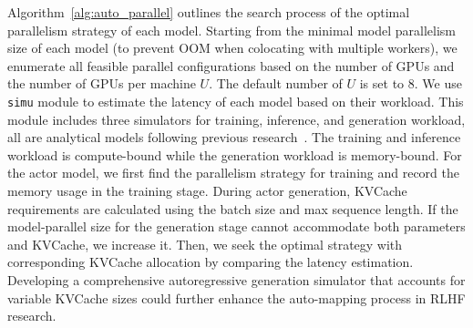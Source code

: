 Algorithm~\ref{alg:auto_parallel} outlines the search process of the optimal parallelism strategy of each model.
Starting from the minimal model parallelism size of each model (to prevent OOM when colocating with multiple workers), we enumerate all feasible parallel configurations based on the number of GPUs and the number of GPUs per machine $U$. The default number of $U$ is set to 8. We use \texttt{simu} module to estimate the latency of each model based on their workload. This module includes three simulators for training, inference, and generation workload, all are analytical models following previous research~\cite{yuan2024llmrooftline, zhongDistServeDisaggregatingPrefill2024, llm-analysis}. The training and inference workload is compute-bound while the generation workload is memory-bound.
For the actor model, we first find the parallelism strategy for training and record the memory usage in the training stage. 
During actor generation, KVCache requirements are calculated using the batch size and max sequence length. If the model-parallel size for the generation stage cannot accommodate both parameters and KVCache, we increase it.
Then, we seek the optimal strategy with corresponding KVCache allocation by comparing the latency estimation.
Developing a comprehensive autoregressive generation simulator that accounts for variable KVCache sizes could further enhance the auto-mapping process in RLHF research.
